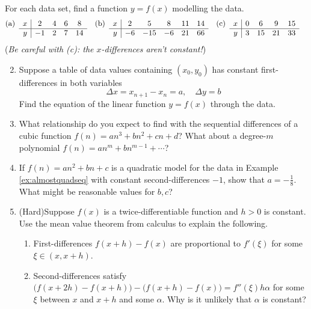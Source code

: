 \begin{exercises}{}{}
	\exstart For each data set, find a function $y=f(x)$ modelling the data.
	\begin{align*}
		&\text{(a)}\lstsp
		\begin{array}[t]{c|ccccc}
			x&2&4&6&8\\\hline
			y&-1&2&7&14
		\end{array}
		&&\text{(b)}\lstsp
		\begin{array}[t]{c|ccccc}
			x&2&5&8&11&14\\\hline
			y&-6&-15&-6&21&66
		\end{array}
		&&\text{(c)}\lstsp
		\begin{array}[t]{c|ccccc}
			x&0&6&9&15\\\hline
			y&3&15&21&33
		\end{array}
	\end{align*}
	(\emph{Be careful with (c): the $x$-differences aren't constant!})
	
	\begin{enumerate}\setcounter{enumi}{1}  
	  \item Suppose a table of data values containing $(x_0,y_0)$ has constant first-differences in both variables
	  \[
	  	\Delta x=x_{n+1}-x_n=a,\quad  \Delta y=b
	  \]
	  Find the equation of the linear function $y=f(x)$ through the data.
	  
	
	  \item What relationship do you expect to find with the sequential differences of a cubic function $f(n)=an^3+bn^2+cn+d$? What about a degree-$m$ polynomial $f(n)=an^m+bn^{m-1}+\cdots$?
	  
	  \item If $f(n)=an^2+bn+c$ is a quadratic model for the data in Example \ref{ex:almostquadseq} with constant second-differences $-1$, show that $a=-\frac 18$. What might be reasonable values for $b,c$?  
	  
	  \item (Hard)\lstsp Suppose $f(x)$ is a twice-differentiable function and $h>0$ is constant. Use the mean value theorem from calculus to explain the following.
	  \begin{enumerate}
	    \item First-differences $f(x+h)-f(x)$ are proportional to $f'(\xi)$ for some $\xi\in (x,x+h)$.
	    \item Second-differences satisfy $\bigl(f(x+2h)-f(x+h)\bigr)-\bigl(f(x+h)-f(x)\bigr)=f''(\xi)h\alpha$ for some $\xi$ between $x$ and $x+h$ and some $\alpha$. Why is it unlikely that $\alpha$ is constant?
	  \end{enumerate}
	\end{enumerate}
\end{exercises}


